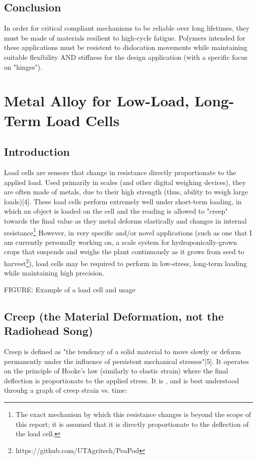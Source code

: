 \documentclass{report}
\newcommand{\myuline}[1]{%
  \uline{\phantom{#1}}%
  \llap{\contour{white}{#1}}%
}
\begin{document}
\subsection{Conclusion}

In order for critical compliant mechanisms to be reliable over long lifetimes, they must be made of materials resilient to high-cycle fatigue. Polymers intended for these applications must be resistent to dislocation movements while maintaining suitable flexibility AND stiffness for the design application (with a specific focus on "hinges").

\section{Metal Alloy for Low-Load, Long-Term Load Cells}

\subsection{Introduction}

Load cells are sensors that change in resistance directly proportionate to the applied load. Used primarily in scales (and other digital weighing devices), they are often made of metals, due to their high strength (thus, ability to weigh large loads)[4].
These load cells perform extremely well under short-term loading, in which an object is loaded on the cell and the reading is allowed to "creep" towards the final value as they metal deforms elastically and changes in internal resistance\footnote{The exact mechanism by which this resistance changes is beyond the scope of this report; it is assumed that it is directly proportionate to the deflection of the load cell.}
However, in very specific and/or novel applications (such as one that I am currently personally working on, a scale system for hydroponically-grown crops that suspends and weighs the plant continuously as it grows from seed to harvest\footnote{https://github.com/UTAgritech/PeaPod}), load cells may be required to perform in low-stress, long-term loading while maintaining high precision.

FIGURE: Example of a load cell and usage

\subsection{Creep (the Material Deformation, not the Radiohead Song)}

Creep is defined as "the tendency of a solid material to move slowly or deform permanently under the influence of persistent mechanical stresses"[5]. 
It operates on the principle of Hooke's law (similarly to elastic strain) where the final deflection is proportionate to the applied stress.
It is \myuline{time-dependant}, and is best understood throuhg a graph of creep strain vs. time:
\end{document}
